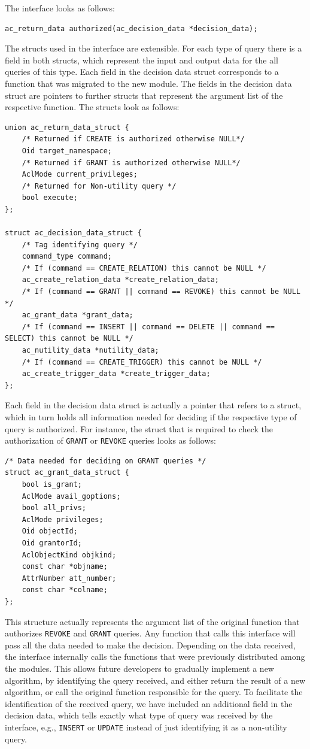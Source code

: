 The interface looks as follows:
%
\begin{lstlisting}[frame=single, style=customc]
ac_return_data authorized(ac_decision_data *decision_data);
\end{lstlisting}
%
The structs used in the interface are extensible. For each type of query there is a field in both structs, which represent the input and output data for the all queries of this type.
%
Each field in the decision data struct corresponds to a function that was migrated to the new module.
%
The fields in the decision data struct are pointers to further structs that represent the argument list of the respective function.
%
The structs look as follows: 
%
\begin{lstlisting}[frame=single, style=customc]
union ac_return_data_struct {
	/* Returned if CREATE is authorized otherwise NULL*/
	Oid target_namespace; 
	/* Returned if GRANT is authorized otherwise NULL*/
	AclMode current_privileges; 
	/* Returned for Non-utility query */
	bool execute; 
};

struct ac_decision_data_struct {
	/* Tag identifying query */
	command_type command;
	/* If (command == CREATE_RELATION) this cannot be NULL */
	ac_create_relation_data *create_relation_data; 
	/* If (command == GRANT || command == REVOKE) this cannot be NULL */
	ac_grant_data *grant_data; 
	/* If (command == INSERT || command == DELETE || command == SELECT) this cannot be NULL */
	ac_nutility_data *nutility_data; 
	/* If (command == CREATE_TRIGGER) this cannot be NULL */
	ac_create_trigger_data *create_trigger_data; 
};
\end{lstlisting}
%
Each field in the decision data struct is actually a pointer that refers to a struct, which in turn holds all information needed for deciding if the respective type of query is authorized.
%
For instance, the struct that is required to check the authorization of \texttt{GRANT} or \texttt{REVOKE} queries looks as follows:
%
\begin{lstlisting}[frame=single, style=customc]
/* Data needed for deciding on GRANT queries */
struct ac_grant_data_struct {
	bool is_grant;
	AclMode avail_goptions;
	bool all_privs;
	AclMode privileges;
	Oid objectId;
	Oid grantorId;
	AclObjectKind objkind;
	const char *objname;
	AttrNumber att_number;
	const char *colname;
};
\end{lstlisting}
%
This structure actually represents the argument list of the original function that authorizes \texttt{REVOKE} and \texttt{GRANT} queries.
%
Any function that calls this interface will pass all the data needed to make the decision.
%
Depending on the data received, the interface internally calls the functions that were previously distributed among the modules.
%
This allows future developers to gradually implement a new algorithm, by identifying the query received, and either return the result of a new algorithm, or call the original function responsible for the query.
%
To facilitate the identification of the received query,  we have included an additional field in the decision data, which tells exactly what type of query was received by the interface, e.g., \texttt{INSERT} or \texttt{UPDATE} instead of just identifying it as a non-utility query.

